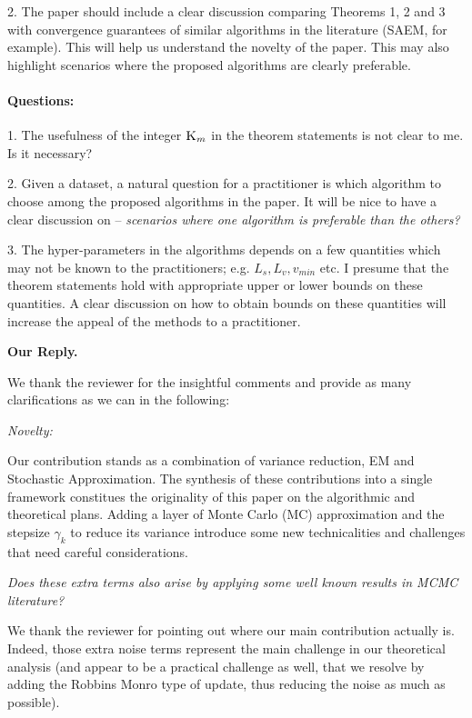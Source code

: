 \documentclass[anon,12pt]{alt2021} %
\begin{document}
2. The paper should include a clear discussion comparing Theorems 1, 2 and 3 with convergence guarantees of similar algorithms
in the literature (SAEM, for example). This will help us understand the novelty of the paper. This may also highlight scenarios where
the proposed algorithms are clearly preferable.


\paragraph{Questions:}


1. The usefulness of the integer $\textsc{K}_m$ in the theorem statements is not clear to me. Is it necessary?

2. Given a dataset, a natural question for a practitioner is which algorithm to choose among the proposed algorithms in the paper.
It will be nice to have a clear discussion on -- \textit{scenarios where one algorithm is preferable than the others?}

3. The hyper-parameters in the algorithms depends on a few quantities which may not be known to the practitioners; e.g. $L_s, L_v, v_{min}$ etc. I
presume that the theorem statements hold with appropriate upper or lower bounds on these quantities. A clear discussion on how to obtain
bounds on these quantities will increase the appeal of the methods to a practitioner.


\vspace{0.1in}
\textbf{Our Reply.}

We thank the reviewer for the insightful comments and provide as many clarifications as we can in the following:

\vspace{0.05in}
\textit{Novelty:}
\vspace{0.05in}

Our contribution stands as a combination of variance reduction, EM and Stochastic Approximation. 
The synthesis of these contributions into a single framework constitues the originality of this paper on the algorithmic and theoretical plans.
Adding a layer of Monte Carlo (MC) approximation and the stepsize $\gamma_k$ to reduce its variance introduce some new technicalities and challenges that need careful considerations.


\vspace{0.05in}
\textit{Does these extra terms also arise by applying some well known results in MCMC literature?}
\vspace{0.05in}

We thank the reviewer for pointing out where our main contribution actually is. 
Indeed, those extra noise terms represent the main challenge in our theoretical analysis (and appear to be a practical challenge as well, that we resolve by adding the Robbins Monro type of update, thus reducing the noise as much as possible).
\end{document}
